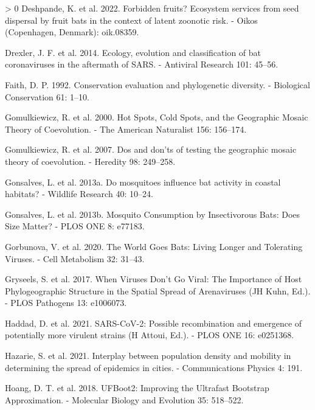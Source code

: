 \documentclass[11pt]{article}
\newlength{\cslhangindent}
\newenvironment{CSLReferences}[3] %
 {%
  \setlength{\parindent}{0pt}
  \ifodd #1 \everypar{\setlength{\hangindent}{\cslhangindent}}\ignorespaces\fi
  \ifnum #2 > 0
  \setlength{\parskip}{#2\baselineskip}
  \fi
 }%
 {}
\begin{document}
\begin{CSLReferences}{1}{0}
\leavevmode\hypertarget{ref-Deshpande2022ForFru}{}%
Deshpande, K. et al. 2022. Forbidden fruits? Ecosystem services from
seed dispersal by fruit bats in the context of latent zoonotic risk. -
Oikos (Copenhagen, Denmark): oik.08359.

\leavevmode\hypertarget{ref-Drexler2014EcoEvo}{}%
Drexler, J. F. et al. 2014. Ecology, evolution and classification of bat
coronaviruses in the aftermath of SARS. - Antiviral Research 101:
45--56.

\leavevmode\hypertarget{ref-Faith1992ConEva}{}%
Faith, D. P. 1992. Conservation evaluation and phylogenetic diversity. -
Biological Conservation 61: 1--10.

\leavevmode\hypertarget{ref-Gomulkiewicz2000HotSpo}{}%
Gomulkiewicz, R. et al. 2000. Hot Spots, Cold Spots, and the Geographic
Mosaic Theory of Coevolution. - The American Naturalist 156: 156--174.

\leavevmode\hypertarget{ref-Gomulkiewicz2007DosDon}{}%
Gomulkiewicz, R. et al. 2007. Dos and don'ts of testing the geographic
mosaic theory of coevolution. - Heredity 98: 249--258.

\leavevmode\hypertarget{ref-Gonsalves2013MosInf}{}%
Gonsalves, L. et al. 2013a. Do mosquitoes influence bat activity in
coastal habitats? - Wildlife Research 40: 10--24.

\leavevmode\hypertarget{ref-Gonsalves2013MosCon}{}%
Gonsalves, L. et al. 2013b. Mosquito Consumption by Insectivorous Bats:
Does Size Matter? - PLOS ONE 8: e77183.

\leavevmode\hypertarget{ref-Gorbunova2020WorGoe}{}%
Gorbunova, V. et al. 2020. The World Goes Bats: Living Longer and
Tolerating Viruses. - Cell Metabolism 32: 31--43.

\leavevmode\hypertarget{ref-Gryseels2017WheVir}{}%
Gryseels, S. et al. 2017. When Viruses Don't Go Viral: The Importance of
Host Phylogeographic Structure in the Spatial Spread of Arenaviruses (JH
Kuhn, Ed.). - PLOS Pathogens 13: e1006073.

\leavevmode\hypertarget{ref-Haddad2021SarPos}{}%
Haddad, D. et al. 2021. SARS-CoV-2: Possible recombination and emergence
of potentially more virulent strains (H Attoui, Ed.). - PLOS ONE 16:
e0251368.

\leavevmode\hypertarget{ref-Hazarie2021IntPop}{}%
Hazarie, S. et al. 2021. Interplay between population density and
mobility in determining the spread of epidemics in cities. -
Communications Physics 4: 191.

\leavevmode\hypertarget{ref-Hoang2018UfbImp}{}%
Hoang, D. T. et al. 2018. UFBoot2: Improving the Ultrafast Bootstrap
Approximation. - Molecular Biology and Evolution 35: 518--522.


\end{CSLReferences}
\end{document}

